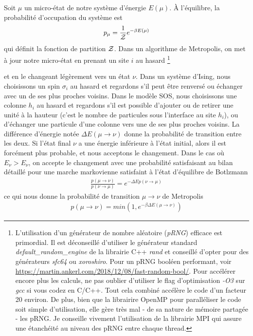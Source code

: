 Soit $\mu$ un micro-état de notre système d'énergie $E(\mu)$. À l'équilibre\cite{gibbs}, la probabilité d'occupation du système est
\begin{align}
	p_\mu = \frac{1}{\mathcal{Z}} e^{-\beta E(\mu)}
\end{align}
qui définit la fonction de partition $\mathcal{Z}$. Dans un algorithme de Metropolis, on met à jour notre micro-état en prenant un site $i$ au hasard
\footnote{L'utilisation d'un générateur de nombre aléatoire (\textit{pRNG}) efficace est primordial. Il est déconseillé d'utiliser le générateur standard \textit{default\_random\_engine} de la librairie C++ \textit{rand} et conseillé d'opter pour des générateurs \textit{sfc64} ou \textit{xoroshiro}. Pour un pRNG booléen performant, voir \url{https://martin.ankerl.com/2018/12/08/fast-random-bool/}. Pour accélérer encore plus les calculs, ne pas oublier d'utiliser le flag d'optimisation \textit{-O3}  sur \textit{gcc} si vous codez en C/C++. Tout cela combiné accélère le code d'un facteur 20 environ. \newline
De plus, bien que la librairire OpenMP pour paralléliser le code soit simple d'utilisation, elle gère très mal - de sa nature de mémoire partagée - les pRNG. Je conseille vivement l'utilisation de la librairie MPI qui assure une étanchéité au niveau des pRNG entre chaque thread.} 

et en le changeant légèrement vers un état $\nu$. Dans un système d'Ising, nous choisissons un spin $\sigma_i$ au hasard et regardons s'il peut être renversé ou échanger avec un de ses plus proches voisins. Dans le modèle SOS, nous choisissons une colonne $h_i$ au hasard et regardons s'il est possible d'ajouter ou de retirer une unité à la hauteur (c'est le nombre de particules sous l'interface au site $h_i$), ou d'échanger une particule d'une colonne vers une de ses plus proches voisins.
La différence d'énergie notée $\Delta E(\mu \rightarrow \nu)$ donne la probabilité de transition entre les deux. Si l'état final $\nu$ a une énergie inférieure à l'état initial, alors il est forcément plus probable, et nous acceptons le changement. Dans le cas où $E_\nu \greater E_\nu$, on accepte le changement avec une probabilité satisfaisant au bilan détaillé pour une marche markovienne satisfaint à l'état d'équilibre de Botlzmann
\begin{align}
\frac{p(\mu \rightarrow \nu)}{p(\nu \rightarrow \mu)} = e^{-\Delta Ep(\nu \rightarrow \mu)}
\end{align}
ce qui nous donne la probabilité de transition $\mu \to \nu$ de Metropolis
\begin{align}
	p(\mu \rightarrow \nu) = min(1,e^{-\beta \Delta E(\mu \rightarrow \nu)})
\end{align}

